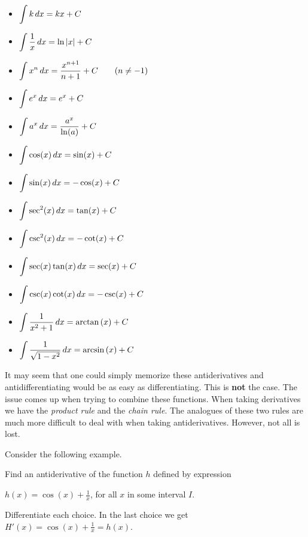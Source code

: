 \documentclass{ximera}
\begin{document}
\begin{theorem}\hfil
	\begin{itemize}
		\item $\displaystyle \int k \,d x= k x+C$
		\item $\displaystyle \int \frac{1}{x} \,d x= \ln|x|+C$
		\item $\displaystyle \int x^n \,d x= \frac{x^{n+1}}{n+1}+C\qquad(n\ne-1)$
		\item $\displaystyle \int e^x \,d x= e^x + C$
		\item $\displaystyle \int a^x \,d x= \frac{a^x}{\ln(a)}+C$
		\item $\displaystyle \int \cos(x) \,d x = \sin(x) + C$
		\item $\displaystyle \int \sin(x) \,d x = -\cos(x) + C$  
		\item $\displaystyle \int \sec^2(x) \,d x = \tan(x) + C$
		\item $\displaystyle \int \csc^2(x) \,d x = -\cot(x) + C$
		\item $\displaystyle \int \sec(x)\tan(x) \,d x = \sec(x) + C$
		\item $\displaystyle \int \csc(x)\cot(x) \,d x = -\csc(x) + C$
		\item $\displaystyle \int \frac{1}{x^2+1}\,d x = \arctan{(x)} + C$
		\item $\displaystyle \int \frac{1}{\sqrt{1-x^2}}\,d x= \arcsin{(x)}+C$
	\end{itemize}
\end{theorem}


It may seem that one could simply memorize these antiderivatives and antidifferentiating would be as easy as differentiating. This is
\textbf{not} the case. The issue comes up when trying to combine these functions.  When taking derivatives we have the \textit{product rule} 
and the \textit{chain rule}. The analogues of these two rules are much more difficult to deal with when taking antiderivatives. However, not
all is lost.

Consider the following example.
\begin{example}
	  Find  an antiderivative of the function $h$ defined by expression
	  
	   $h(x)=\cos(x)+\frac{1}{x}$, for all $x$ in some interval $I$.
	  \begin{multipleChoice}
	  \end{multipleChoice}
	  \begin{feedback}
	 	   Differentiate each choice.  In the last choice we get
	    	$H'(x)=\cos(x)+\frac{1}{x}=h(x)$.
	  \end{feedback}
\end{example}
\end{document}
